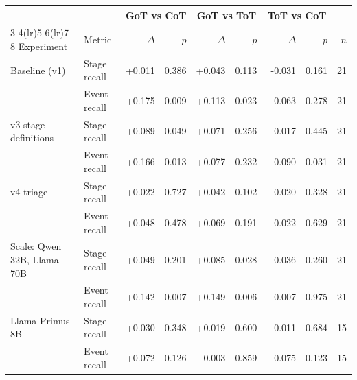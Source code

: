 \begin{tabular}{@{}llrrrrrrr@{}}
\toprule
 & & \multicolumn{2}{c}{GoT vs CoT} & \multicolumn{2}{c}{GoT vs ToT} & \multicolumn{2}{c}{ToT vs CoT} & \\
\cmidrule(lr){3-4}\cmidrule(lr){5-6}\cmidrule(lr){7-8}
Experiment & Metric & $\Delta$ & $p$ & $\Delta$ & $p$ & $\Delta$ & $p$ & $n$ \\
\midrule
Baseline (v1) & Stage recall & +0.011 & 0.386 & +0.043 & 0.113 & -0.031 & 0.161 & 21 \\
 & Event recall & +0.175 & 0.009 & +0.113 & 0.023 & +0.063 & 0.278 & 21 \\
\addlinespace
v3 stage definitions & Stage recall & +0.089 & 0.049 & +0.071 & 0.256 & +0.017 & 0.445 & 21 \\
 & Event recall & +0.166 & 0.013 & +0.077 & 0.232 & +0.090 & 0.031 & 21 \\
\addlinespace
v4 triage & Stage recall & +0.022 & 0.727 & +0.042 & 0.102 & -0.020 & 0.328 & 21 \\
 & Event recall & +0.048 & 0.478 & +0.069 & 0.191 & -0.022 & 0.629 & 21 \\
\addlinespace
Scale: Qwen 32B, Llama 70B & Stage recall & +0.049 & 0.201 & +0.085 & 0.028 & -0.036 & 0.260 & 21 \\
 & Event recall & +0.142 & 0.007 & +0.149 & 0.006 & -0.007 & 0.975 & 21 \\
\addlinespace
Llama-Primus 8B & Stage recall & +0.030 & 0.348 & +0.019 & 0.600 & +0.011 & 0.684 & 15 \\
 & Event recall & +0.072 & 0.126 & -0.003 & 0.859 & +0.075 & 0.123 & 15 \\
\bottomrule
\end{tabular}
